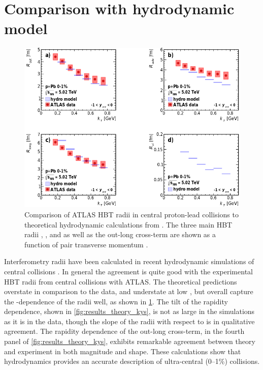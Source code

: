 \FloatBarrier
\section{Comparison with hydrodynamic model}

\begin{figure}[t]
\centering
\includegraphics[width=\linewidth]{theory_bozek_kt.png}
\caption{Comparison of ATLAS HBT radii in central proton-lead collisions to theoretical hydrodynamic calculations from . The three main HBT radii \Rout, \Rside, and \Rlong as well as the out-long cross-term \Rol are shown as a function of pair transverse momentum \kt.}
\label{fig:results_theory_kt}
\end{figure}

Interferometry radii have been calculated in recent hydrodynamic simulations of central \pPb collisions \cite{Bozek:2017bwp}.
In general the agreement is quite good with the experimental \ac{HBT} radii from central collisions with ATLAS.
The theoretical predictions overstate \Rside in comparison to the data, and understate \Rlong at low \kt, but overall capture the \kt-dependence of the radii well, as shown in \cref{fig:results_theory_kt}.
The tilt of the rapidity dependence, shown in \cref{fig:results_theory_kys}, is not as large in the simulations as it is in the data, though the slope of the radii with respect to \kys is in qualitative agreement.
The rapidity dependence of the out-long cross-term, in the fourth panel of \cref{fig:results_theory_kys}, exhibits remarkable agreement between theory and experiment in both magnitude and shape.
These calculations show that hydrodynamics provides an accurate description of ultra-central (0--1\%) \pPb collisions.

